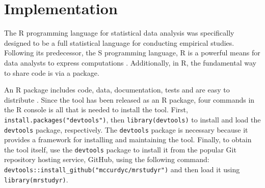 \section{Implementation}

The R programming language for statistical data analysis was specifically designed to
be a full statistical language for conducting empirical studies. Following its predecessor, the S programming
language, R is a powerful means for data analysts to express computations \cite{ihaka1996r}.
Additionally, in R, the fundamental way to share code is via a package.

An R package includes code, data, documentation, tests and are easy to distribute \cite{wickham2015r}.
Since the \mr tool has been released as an R package, four commands in the R console
is all that is needed to install the tool.
First, \texttt{install.packages("devtools")}, then \texttt{library(devtools)}
to install and load the \texttt{devtools}\cite{devtools} package, respectively.
The \texttt{devtools} package is necessary because it provides a framework for installing
and maintaining the tool. Finally, to obtain the
\mr\cite{mrstudyr} tool itself, use the \texttt{devtools} package to install it
from the popular Git repository hosting service, GitHub\cite{github},
using the following command: {\small\texttt{devtools::install\_github("mccurdyc/mrstudyr")}}
and then load it using \texttt{library(mrstudyr)}.






